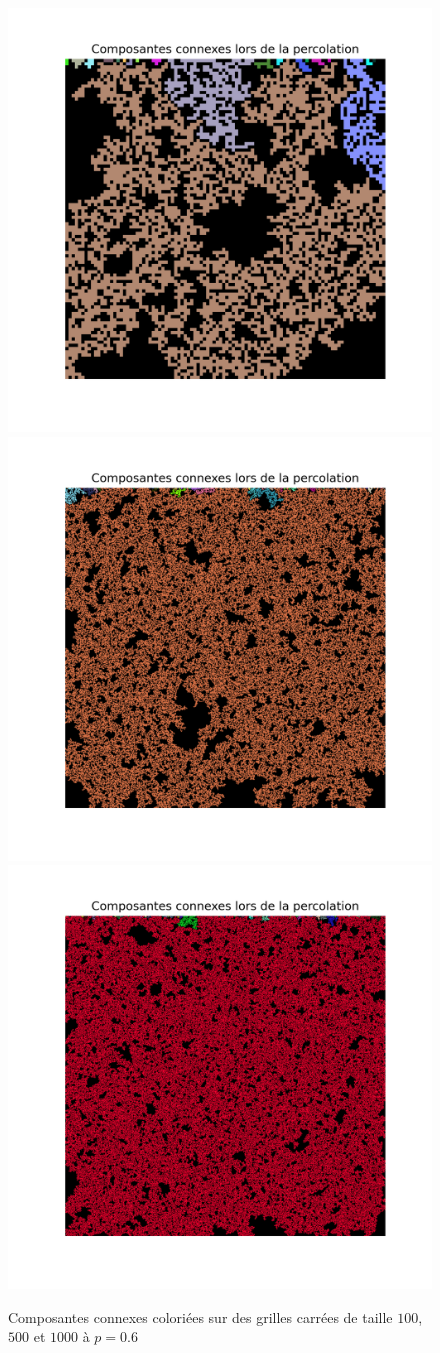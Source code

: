 \documentclass[11pt,a4paper]{article}
\begin{document}
\begin{figure}[htp]

\centering
\includegraphics[width=.3333\textwidth]{cc100.png}\hfill
\includegraphics[width=.3333\textwidth]{cc500.png}\hfill
\includegraphics[width=.3333\textwidth]{cc1000.png}

\caption{Composantes connexes coloriées sur des grilles carrées de taille $100$, $500$ et $1000$ à $p=0.6$}
\label{fig:figure3}

\end{figure}

\newpage
\printbibliography[heading=bibintoc, title={Références}]
\end{document}
